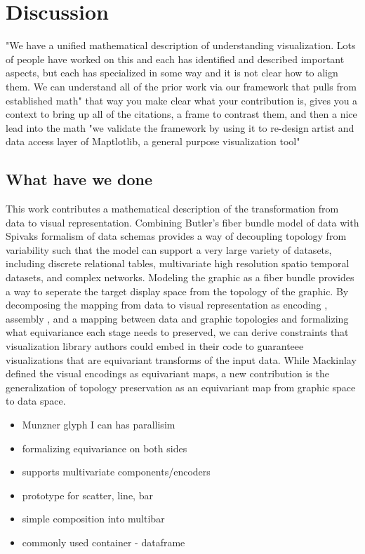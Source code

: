 \documentclass[../main.tex]{subfiles}
\begin{document}
\section{Discussion}

"We have a unified mathematical description of understanding visualization.  Lots of people have worked on this and each has identified and described important aspects, but each has specialized in some way and it is not clear how to align them.  We can understand all of the prior work via our framework that pulls from {established math}"
that way you make clear what your contribution is, gives you a context to bring up all of the citations, a frame to contrast them, and then a nice lead into the math
 "we validate the framework by using it to re-design artist and data access layer of Maptlotlib, a general purpose visualization tool"

\subsection{What have we done}
This work contributes a mathematical description of the transformation from data to visual representation. Combining Butler's fiber bundle model of data with Spivaks formalism of data schemas provides a way of decoupling topology from variability such that the model can support a very large variety of datasets, including discrete relational tables, multivariate high resolution spatio temporal datasets, and complex networks. Modeling the graphic as a fiber bundle provides a way to seperate the target display space from the topology of the graphic. By decomposing the mapping from data to visual representation as encoding \vchannel, assembly \vmark, and a mapping between data and graphic topologies \vindex and formalizing what equivariance each stage needs to preserved, we can derive constraints that visualization library authors could embed in their code to guaranteee visualizations that are equivariant transforms of the input data. While Mackinlay defined the visual encodings as equivariant maps, a new contribution is the generalization of topology preservation as an equivariant map from graphic space to data space. 



 \begin{itemize}
    \item Munzner glyph I can has parallisim
    \item formalizing equivariance on both sides
    \item supports multivariate components/encoders 
    \item prototype for scatter, line, bar
    \item simple composition into multibar
    \item commonly used container - dataframe
 \end{itemize}
\end{document}
